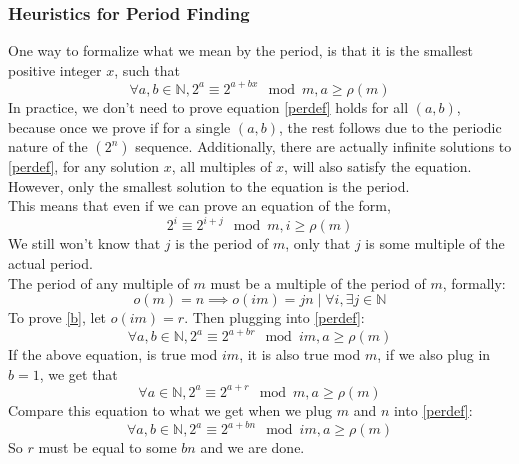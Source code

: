 \documentclass{article}
\begin{document}
  \subsubsection{Heuristics for Period Finding}
  One way to formalize what we mean by the period, is that it is the smallest positive integer $x$, such that
  \begin{equation}\label{perdef}
    \forall a, b \in \mathbb{N}, 2^a \equiv 2^{a+bx} \mod m, a \geq \rho(m)
  \end{equation}
  In practice, we don't need to prove equation \eqref{perdef} holds for all $(a,b)$, because once we prove if for a single $(a,b)$, the rest follows due to the periodic nature of the $(2^n)$ sequence. Additionally, there are actually infinite solutions to \eqref{perdef}, for any solution $x$, all multiples of $x$, will also satisfy the equation. However, only the smallest solution to the equation is the period.\\
  
  This means that even if we can prove an equation of the form,
  \begin{equation}\label{a}
    2^i \equiv 2^{i+j} \mod m, i \geq \rho(m)
  \end{equation}
  We still won't know that $j$ is the period of $m$, only that $j$ is some multiple of the actual period.\\
  
  The period of any multiple of $m$ must be a multiple of the period of $m$, formally:
  \begin{equation}\label{b}
    o(m) = n \implies o(im) = jn \mid \forall i, \exists j \in \mathbb{N}
  \end{equation}
  To prove \eqref{b}, let $o(im) = r$. Then plugging into \eqref{perdef}:
  \begin{equation}
    \forall a, b \in \mathbb{N}, 2^a \equiv 2^{a+br} \mod im, a \geq \rho(m)
  \end{equation}
  If the above equation, is true mod $im$, it is also true mod $m$, if we also plug in $b=1$, we get that
  \begin{equation}
    \forall a \in \mathbb{N}, 2^a \equiv 2^{a+r} \mod m, a \geq \rho(m)
  \end{equation}
  Compare this equation to what we get when we plug $m$ and $n$ into \eqref{perdef}:
  \begin{equation}
    \forall a, b \in \mathbb{N}, 2^a \equiv 2^{a+bn} \mod im, a \geq \rho(m)
  \end{equation}
  So $r$ must be equal to some $bn$ and we are done.\\
\end{document}
